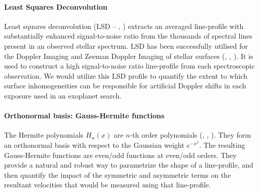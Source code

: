 \documentclass[a4paper]{article}
\begin{document}
\paragraph{Least Squares Deconvolution}
Least squares deconvolution (LSD -- \cite{Donati1997}, \cite{Kochukhov2010}) extracts an averaged line-profile with substantially enhanced signal-to-noise ratio from the thousands of spectral lines present in an observed stellar spectrum. LSD has been successfully utilised for the Doppler Imaging and Zeeman Doppler Imaging of stellar surfaces (\cite{Rice2002}, \cite{Strassmeier2007}, \cite{Hackman2016}). It is used to construct a high signal-to-noise ratio line-profile from each spectroscopic observation. We would utilize this LSD profile to quantify the extent to which surface inhomogeneities can be responsible for artificial Doppler shifts in each exposure used in an exoplanet search.

\paragraph{Orthonormal basis: Gauss-Hermite functions}
The Hermite polynomials $H_n(x)$ are $n$-th order polynomials (\cite{LaPlace1820}, \cite{Chebyshev1859}, \cite{hermite1864nouveau}). They form an orthonormal basis with respect to the Gaussian weight $e^{-x^2}$. The resulting Gauss-Hermite functions are even/odd functions at even/odd orders. They provide a natural and robust way to parametrize the shape of a line-profile, and then quantify the impact of the symmetric and asymmetric terms on the resultant velocities that would be measured using that line-profile. 



\end{document}
